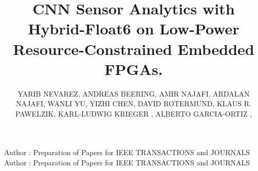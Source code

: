 \title {CNN Sensor Analytics with Hybrid-Float6 on Low-Power Resource-Constrained Embedded FPGAs.}

\author{
	\uppercase{Yarib Nevarez},
	\uppercase{Andreas Beering},
	\uppercase{Amir Najafi},
	\uppercase{Ardalan Najafi},
	\uppercase{Wanli Yu},
	\uppercase{Yizhi Chen},
	\uppercase{David Rotermund},
	\uppercase{Klaus R. Pawelzik},
	\uppercase{Karl-Ludwig Krieger} ,
	\uppercase{Alberto Garcia-Ortiz} ,
}

\address[1]{Institute of Electrodynamics and Microelectronics, University of Bremen, Bremen 28359, Germany}

\address[2]{Institute for Theoretical Physics, University of Bremen, Bremen 28359, Germany}

\address[3]{School of Electrical Engineering and Computer Science, KTH Royal Institute of Technology, 10044 Stockholm, Sweden}



\markboth
{Author \headeretal: Preparation of Papers for IEEE TRANSACTIONS and JOURNALS}
{Author \headeretal: Preparation of Papers for IEEE TRANSACTIONS and JOURNALS}



